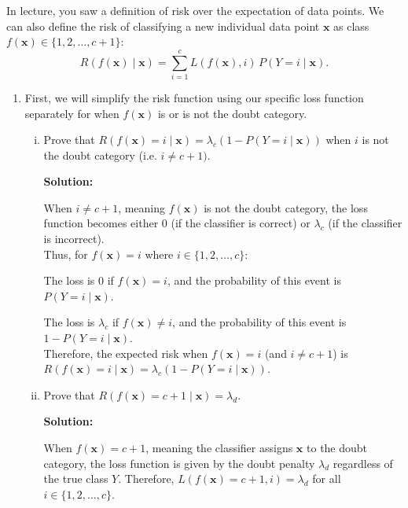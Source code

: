 \documentclass{article}
\renewcommand{\vec}[1]{\boldsymbol{\mathbf{#1}}}
\newenvironment{solution}{\color{blue} \smallskip \textbf{Solution:}}{}
\begin{document}
In lecture, you saw a definition of risk over the expectation of data points. We can also define the risk of
classifying a new individual data point $\vec{x}$ as class $f(\vec{x}) \in
\{1,2,\dots,c+1\}$:
$$R(f(\vec{x}) \mid \vec{x}) = \sum_{i=1}^{c}
L(f(\vec{x}), i) \, P(Y=i \mid \vec{x}).$$ 

\begin{enumerate}

\item First, we will simplify the risk function using our specific loss function separately for when $f(\vec{x})$ is or is not the doubt category.
\begin{enumerate}[i.]

\item Prove that $R(f(\vec{x}) = i \mid \vec{x}) = \lambda_c \left(1 - P(Y = i \mid \vec{x}) \right)$ when $i$ is not the doubt category (i.e. $i \neq c + 1)$. 

\begin{solution}


When \(i \neq c+1\), meaning \(f(\mathbf{x})\) is not the doubt category, the loss function becomes either 0 (if the classifier is correct) or \(\lambda_c\) (if the classifier is incorrect).\\

Thus, for \(f(\mathbf{x}) = i\) where \(i \in \{1, 2, \ldots, c\}\):

The loss is 0 if \(f(\mathbf{x}) = i\), and the probability of this event is \(P(Y = i \mid \mathbf{x})\).

The loss is \(\lambda_c\) if \(f(\mathbf{x}) \neq i\), and the probability of this event is \(1 - P(Y = i \mid \mathbf{x})\).\\

Therefore, the expected risk when \(f(\mathbf{x}) = i\) (and \(i \neq c+1\)) is \( R(f(\mathbf{x}) = i \mid \mathbf{x}) = \lambda_c \left(1 - P(Y = i \mid \mathbf{x})\right) \).



\end{solution}

\item Prove that $R(f(\vec{x}) = c+1 \mid \vec{x}) = \lambda_{d}$.

\begin{solution}




When \(f(\mathbf{x}) = c + 1\), meaning the classifier assigns \(\mathbf{x}\) to the doubt category, the loss function is given by the doubt penalty \(\lambda_d\) regardless of the true class \(Y\). Therefore, \( L(f(\mathbf{x}) = c+1, i) = \lambda_d \) for all \( i \in \{1, 2, \dots, c\} \).\\



\end{solution}
\end{enumerate}
\end{enumerate}
\end{document}
